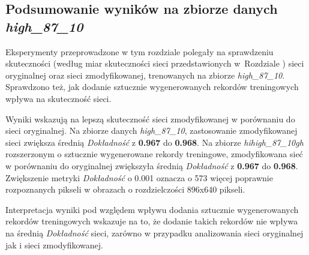 \subsection{Podsumowanie wyników na zbiorze danych \textit{high\_87\_10}}
Eksperymenty przeprowadzone w tym rozdziale polegały na sprawdzeniu skuteczności (według miar skuteczności sieci przedstawionych w~Rozdziale ) sieci oryginalnej oraz sieci zmodyfikowanej, trenowanych na zbiorze \textit{high\_87\_10}.
Sprawdzono też, jak dodanie sztucznie wygenerowanych rekordów treningowych wpływa na skuteczność sieci.


Wyniki wskazują na lepszą skuteczność sieci zmodyfikowanej w porównaniu do sieci oryginalnej.
Na zbiorze danych \textit{high\_87\_10}, zastosowanie zmodyfikowanej sieci zwiększa średnią \textit{Dokładność} z \textbf{0.967} do \textbf{0.968}.
Na zbiorze \textit{hihigh\_87\_10gh} rozszerzonym o sztucznie wygenerowane rekordy treningowe, zmodyfikowana sieć w porównaniu do oryginalnej zwiększyła średnią \textit{Dokładność} z \textbf{0.967} do \textbf{0.968}.
Zwiększenie metryki \textit{Dokładność} o 0.001 oznacza o 573 więcej poprawnie rozpoznanych pikseli w obrazach o rozdzielczości 896x640 pikseli.


Interpretacja wyniki pod względem wpływu dodania sztucznie wygenerowanych rekordów treningowych wskazuje na to, że dodanie takich rekordów nie wpływa na średnią \textit{Dokładność} sieci, zarówno w przypadku analizowania sieci oryginalnej jak i sieci zmodyfikowanej.
